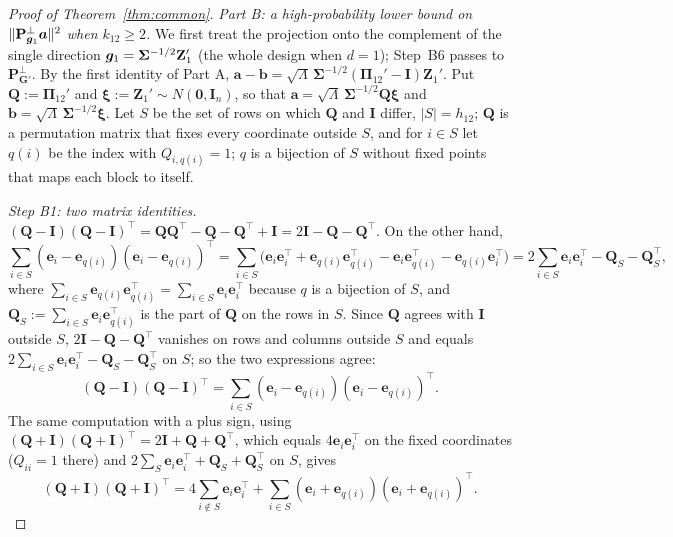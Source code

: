 \documentclass[11pt]{article}
\theoremstyle{definition}
\newcommand{\bZ}{\mathbf{Z}}
\newcommand{\bI}{\mathbf{I}}
\newcommand{\bzero}{\mathbf{0}}
\newcommand{\bSig}{\boldsymbol{\Sigma}}
\newcommand{\bPi}{\boldsymbol{\Pi}}
\begin{document}
\begin{proof}[Proof of Theorem~\ref{thm:common}]
\emph{Part B: a high-probability lower bound on $\|\mathbf P^\perp_{\bm{g}_1}\bm a\|^2$ when $k_{12}\ge2$.} We first treat the projection onto the complement of the single direction $\bg_1=\bSig^{-1/2}\bZ_1'$ (the whole design when $d=1$); Step~B6 passes to $\mathbf P^\perp_{\mathbf G'}$. By the first identity of Part A, $\bm a-\bm b=\sqrt\Lambda\,\bSig^{-1/2}(\bPi_{12}'-\bI)\bZ_1'$. Put $\mathbf Q:=\bPi_{12}'$ and $\bm\xi:=\bZ_1'\sim N(\bzero,\bI_n)$, so that $\bm a=\sqrt\Lambda\,\bSig^{-1/2}\mathbf Q\bm\xi$ and $\bm b=\sqrt\Lambda\,\bSig^{-1/2}\bm\xi$. Let $S$ be the set of rows on which $\mathbf Q$ and $\bI$ differ, $|S|=h_{12}$; $\mathbf Q$ is a permutation matrix that fixes every coordinate outside $S$, and for $i\in S$ let $q(i)$ be the index with $Q_{i,q(i)}=1$; $q$ is a bijection of $S$ without fixed points that maps each block to itself.

\emph{Step B1: two matrix identities.} $(\mathbf Q-\bI)(\mathbf Q-\bI)^\top=\mathbf Q\mathbf Q^\top-\mathbf Q-\mathbf Q^\top+\bI=2\bI-\mathbf Q-\mathbf Q^\top$. On the other hand,
\[
\sum_{i\in S}(\bm e_i-\bm e_{q(i)})(\bm e_i-\bm e_{q(i)})^\top=\sum_{i\in S}\big(\bm e_i\bm e_i^\top+\bm e_{q(i)}\bm e_{q(i)}^\top-\bm e_i\bm e_{q(i)}^\top-\bm e_{q(i)}\bm e_i^\top\big)=2\sum_{i\in S}\bm e_i\bm e_i^\top-\mathbf Q_S-\mathbf Q_S^\top,
\]
where $\sum_{i\in S}\bm e_{q(i)}\bm e_{q(i)}^\top=\sum_{i\in S}\bm e_i\bm e_i^\top$ because $q$ is a bijection of $S$, and $\mathbf Q_S:=\sum_{i\in S}\bm e_i\bm e_{q(i)}^\top$ is the part of $\mathbf Q$ on the rows in $S$. Since $\mathbf Q$ agrees with $\bI$ outside $S$, $2\bI-\mathbf Q-\mathbf Q^\top$ vanishes on rows and columns outside $S$ and equals $2\sum_{i\in S}\bm e_i\bm e_i^\top-\mathbf Q_S-\mathbf Q_S^\top$ on $S$; so the two expressions agree:
\[
(\mathbf Q-\bI)(\mathbf Q-\bI)^\top=\sum_{i\in S}(\bm e_i-\bm e_{q(i)})(\bm e_i-\bm e_{q(i)})^\top .
\]
The same computation with a plus sign, using $(\mathbf Q+\bI)(\mathbf Q+\bI)^\top=2\bI+\mathbf Q+\mathbf Q^\top$, which equals $4\bm e_i\bm e_i^\top$ on the fixed coordinates ($Q_{ii}=1$ there) and $2\sum_S\bm e_i\bm e_i^\top+\mathbf Q_S+\mathbf Q_S^\top$ on $S$, gives
\[
(\mathbf Q+\bI)(\mathbf Q+\bI)^\top=4\sum_{i\notin S}\bm e_i\bm e_i^\top+\sum_{i\in S}(\bm e_i+\bm e_{q(i)})(\bm e_i+\bm e_{q(i)})^\top .
\]


\end{proof}
\end{document}
